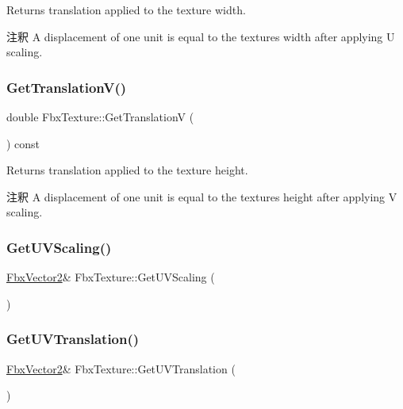 Returns translation applied to the texture width. \begin{DoxyRemark}{注釈}
A displacement of one unit is equal to the texture\textquotesingle{}s width after applying U scaling. 
\end{DoxyRemark}
\mbox{\label{class_fbx_texture_a96e08939c1efcc3edbc7392a86fb6c43}} 
\subsubsection{\texorpdfstring{Get\+Translation\+V()}{GetTranslationV()}}
{\footnotesize\ttfamily double Fbx\+Texture\+::\+Get\+TranslationV (\begin{DoxyParamCaption}{ }\end{DoxyParamCaption}) const}

Returns translation applied to the texture height. \begin{DoxyRemark}{注釈}
A displacement of one unit is equal to the texture\textquotesingle{}s height after applying V scaling. 
\end{DoxyRemark}
\mbox{\label{class_fbx_texture_a7b3d7fa85a447f0250555bb54f8d36b8}} 
\subsubsection{\texorpdfstring{Get\+U\+V\+Scaling()}{GetUVScaling()}}
{\footnotesize\ttfamily \hyperlink{class_fbx_vector2}{Fbx\+Vector2}\& Fbx\+Texture\+::\+Get\+U\+V\+Scaling (\begin{DoxyParamCaption}{ }\end{DoxyParamCaption})}

\mbox{\label{class_fbx_texture_a091e91a0be7caf96f48a8f3fb3cb08d2}} 
\subsubsection{\texorpdfstring{Get\+U\+V\+Translation()}{GetUVTranslation()}}
{\footnotesize\ttfamily \hyperlink{class_fbx_vector2}{Fbx\+Vector2}\& Fbx\+Texture\+::\+Get\+U\+V\+Translation (\begin{DoxyParamCaption}{ }\end{DoxyParamCaption})}


